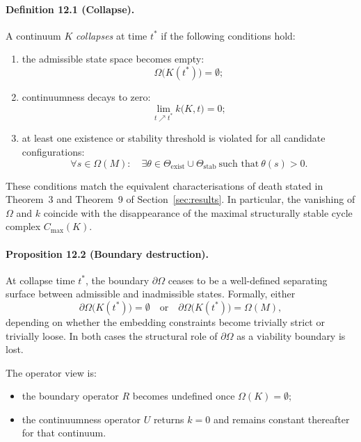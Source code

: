 \paragraph{Definition 12.1 (Collapse).}
A continuum \(K\) \emph{collapses} at time \(t^{\ast}\) if the following
conditions hold:
\begin{enumerate}
  \item the admissible state space becomes empty:
        \[
          \Omega\big(K(t^{\ast})\big) = \emptyset;
        \]
  \item continuumness decays to zero:
        \[
          \lim_{t \nearrow t^{\ast}} k\big(K,t\big) = 0;
        \]
  \item at least one existence or stability threshold is violated for all
        candidate configurations:
        \[
          \forall s \in \Omega(M):
          \quad
          \exists \theta \in \Theta_{\mathrm{exist}} \cup \Theta_{\mathrm{stab}}
          \ \text{such that}\ \theta(s) > 0.
        \]
\end{enumerate}

These conditions match the equivalent characterisations of death stated in
Theorem~3 and Theorem~9 of Section~\ref{sec:results}.
In particular, the vanishing of \(\Omega\) and \(k\) coincide with the
disappearance of the maximal structurally stable cycle complex
\(C_{\max}(K)\).

\paragraph{Proposition 12.2 (Boundary destruction).}
At collapse time \(t^{\ast}\), the boundary \(\partial\Omega\) ceases to be a
well-defined separating surface between admissible and inadmissible states.
Formally, either
\begin{equation}
  \partial\Omega\big(K(t^{\ast})\big) = \emptyset
  \quad\text{or}\quad
  \partial\Omega\big(K(t^{\ast})\big) = \Omega(M),
\end{equation}
depending on whether the embedding constraints become trivially strict or
trivially loose. In both cases the structural role of \(\partial\Omega\)
as a viability boundary is lost.

The operator view is:
\begin{itemize}
  \item the boundary operator \(R\) becomes undefined once
        \(\Omega(K)=\emptyset\);
  \item the continuumness operator \(U\) returns \(k=0\) and remains
        constant thereafter for that continuum.
\end{itemize}

